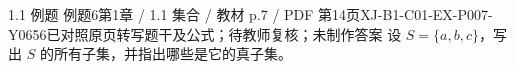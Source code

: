 \par\noindent\begin{minipage}{\linewidth}
\begin{bankitem}{1.1 例题 例题6}{第1章 / 1.1 集合 / 教材 p.7 / PDF 第14页}{XJ-B1-C01-EX-P007-Y0656}{已对照原页转写题干及公式；待教师复核；未制作答案}
设 $S=\{a,b,c\}$，写出 $S$ 的所有子集，并指出哪些是它的真子集。
\end{bankitem}
\end{minipage}\par\medskip
